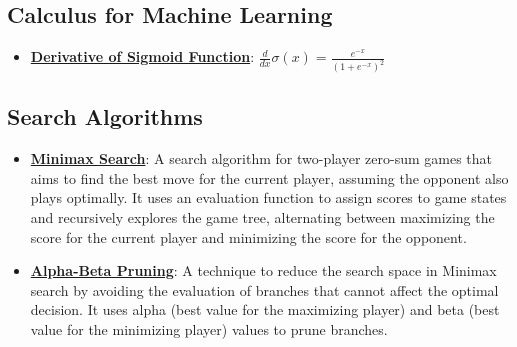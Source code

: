 \documentclass{article}%
\begin{document}
%
\subsection{Calculus for Machine Learning}%
\label{subsec:CalculusforMachineLearning}%
\begin{itemize}[leftmargin=*]%
\item \href{\url{https://purdue.brightspace.com/d2l/common/assets/pdfjs-d2l-dist/1.0.14-legacy/web/viewer.html?file=\%252Fcontent\%252Fenforced\%252F1095467-wl.202510.CS.24300.001\%252F04L1-Linear\%20Algebra\%20Primer.pdf\%253Fou\%253D1095467\&lang=en-us\&container=d2l-fileviewer-rendered-pdf\&fullscreen=d2l-fileviewer-rendered-pdf-dialog\&height=667}#page=21}{\textbf{Derivative of Sigmoid Function}}: $\frac{d}{dx} \sigma(x) = \frac{e^{-x}}{(1 + e^{-x})^2}$%
\end{itemize}

%
\subsection{Search Algorithms}%
\label{subsec:SearchAlgorithms}%
\begin{itemize}[leftmargin=*]%
\item \href{\url{https://purdue.brightspace.com/d2l/common/assets/pdfjs-d2l-dist/1.0.14-legacy/web/viewer.html?file=\%252Fcontent\%252Fenforced\%252F1095467-wl.202510.CS.24300.001\%252F02L2-Intro.pdf\%253Fou\%253D1095467\&lang=en-us\&container=d2l-fileviewer-rendered-pdf\&fullscreen=d2l-fileviewer-rendered-pdf-dialog\&height=667}#page=22}{\textbf{Minimax Search}}: A search algorithm for two-player zero-sum games that aims to find the best move for the current player, assuming the opponent also plays optimally. It uses an evaluation function to assign scores to game states and recursively explores the game tree, alternating between maximizing the score for the current player and minimizing the score for the opponent.%
\item \href{\url{https://purdue.brightspace.com/d2l/common/assets/pdfjs-d2l-dist/1.0.14-legacy/web/viewer.html?file=\%252Fcontent\%252Fenforced\%252F1095467-wl.202510.CS.24300.001\%252F02L2-Intro.pdf\%253Fou\%253D1095467\&lang=en-us\&container=d2l-fileviewer-rendered-pdf\&fullscreen=d2l-fileviewer-rendered-pdf-dialog\&height=667}#page=23}{\textbf{Alpha-Beta Pruning}}: A technique to reduce the search space in Minimax search by avoiding the evaluation of branches that cannot affect the optimal decision. It uses alpha (best value for the maximizing player) and beta (best value for the minimizing player) values to prune branches.%
\end{itemize}
\end{document}
